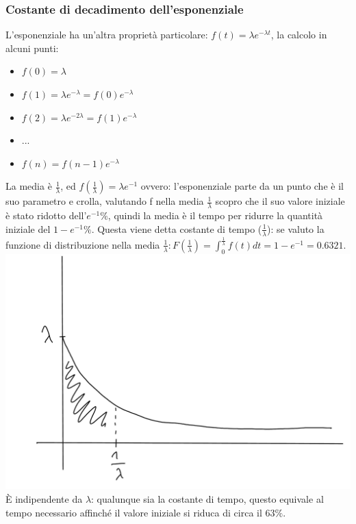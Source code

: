 \documentclass{article}
\begin{document}
\subsubsection{Costante di decadimento dell'esponenziale}
L'esponenziale ha un'altra proprietà particolare: $f(t) = \lambda e^{-\lambda t}$, la calcolo in alcuni punti:
\begin{itemize}
\item $f(0) = \lambda$
\item $f(1) = \lambda e^{-\lambda} = f(0)e^{-\lambda}$
\item $f(2) = \lambda e^{-2\lambda} = f(1)e^{-\lambda}$
\item ...
\item $f(n) = f(n-1)e^{-\lambda}$
\end{itemize}
La media è $\frac{1}{\lambda}$, ed $f(\frac{1}{\lambda}) = \lambda e^{-1}$ ovvero: l'esponenziale parte da un punto che è il suo parametro e crolla, valutando f nella media $\frac{1}{\lambda}$ scopro che il suo valore iniziale è stato ridotto dell'$e^{-1}\%$, quindi la media è il tempo per ridurre la quantità iniziale del $1 - e^{-1} \%$. Questa viene detta costante di tempo ($\frac{1}{\lambda}$): se valuto la funzione di distribuzione nella media $\frac{1}{\lambda}: F(\frac{1}{\lambda}) = \int_{0}^{\frac{1}{\lambda}} f(t) dt = 1 - e^{-1} = 0.6321$.\\
\includegraphics[scale=0.3]{images/PMCSN-exp.jpeg}\\
È indipendente da $\lambda$: qualunque sia la costante di tempo, questo equivale al tempo necessario affinché il valore iniziale si riduca di circa il $63 \%$.
\end{document}
